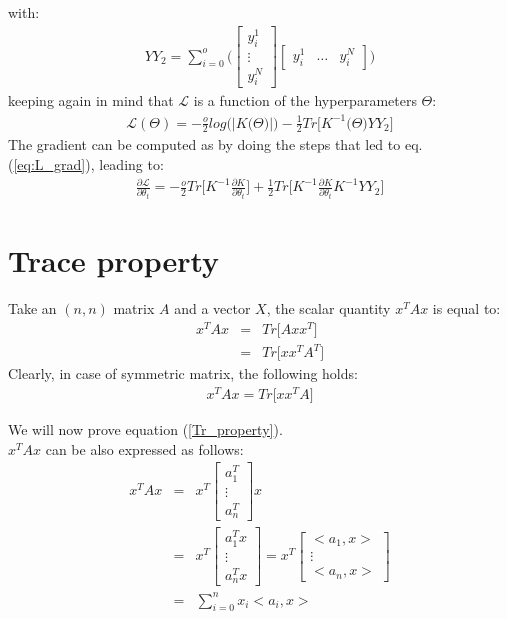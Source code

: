 \documentclass{article}
\begin{document}
with:
\begin{eqnarray}
YY_2 = \sum_{i=0}^o \bigg (
\begin{bmatrix} y^1_i \\ \vdots \\ y^N_i \end{bmatrix}
\begin{bmatrix} y^1_i & \hdots & y^N_i \end{bmatrix}
\bigg )
\end{eqnarray}
keeping again in mind that $\mathcal{L}$ is a function of the hyperparameters $\Theta$:
\begin{eqnarray}
\mathcal{L}(\Theta) = -\frac{o}{2} log \big (\left | K \big (\Theta \big ) \right | \big )
-\frac{1}{2} Tr \bigg [
K^{-1}\big (\Theta \big ) YY_2
\bigg ] 
\end{eqnarray}
The gradient can be computed as by doing the steps that led to 
eq. (\ref{eq:L_grad}), leading to:
\begin{eqnarray}
\frac{\partial \mathcal{L}}{\partial \theta_t} = 
-\frac{o}{2} Tr \bigg [ K^{-1} \frac{\partial K}{\partial \theta_t} \bigg ]
+\frac{1}{2} Tr \bigg [ K^{-1} \frac{\partial K}{\partial \theta_t} K^{-1} YY_2 \bigg ]
\end{eqnarray}

\appendix
\section{Trace property}

Take an $(n,n)$ matrix $A$ and a vector $X$, the scalar quantity $x^T A x$ is equal to:
\begin{eqnarray}
x^T A x &=& Tr \bigg [ 
A xx^T
\bigg ] \\
&=& Tr \bigg [ 
xx^T A^T
\bigg ]
\label{eq:Tr_property}
\end{eqnarray}
Clearly, in case of symmetric matrix, the following holds:
\begin{eqnarray}
x^T A x = Tr \bigg [ 
xx^T A
\bigg ]
\end{eqnarray}

We will now prove equation (\ref{Tr_property}).
\\
$x^T A x$ can be also expressed as follows:
\begin{eqnarray}
x^T A x &=& x^T \begin{bmatrix} 
a_1^T \\
\vdots \\ 
a_n^T
\end{bmatrix} x \\
&=&
x^T \begin{bmatrix} 
a_1^T x \\
\vdots \\ 
a_n^T x
\end{bmatrix} = x^T \begin{bmatrix} 
<a_1, x> \\
\vdots \\ 
<a_n, x>
\end{bmatrix} \\
&=&
\sum_{i = 0}^n x_i <a_i, x>
\label{eq:sum_dots_a}
\end{eqnarray}
\end{document}

